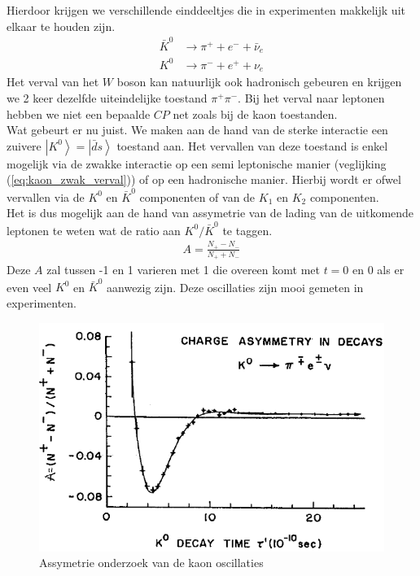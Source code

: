 \documentclass[../main.tex]{subfiles}
\begin{document}
Hierdoor krijgen we verschillende einddeeltjes die in experimenten makkelijk uit elkaar te houden zijn.
\begin{equation}
    \begin{aligned}
        \label{eq:kaon_zwak_verval}
        \bar{K}^{0} &\rightarrow \pi^{+}+e^{-}+\bar{\nu}_{e} \\
        K^{0} &\rightarrow \pi^{-}+e^{+}+\nu_{e}
    \end{aligned}
\end{equation}
Het verval van het $W$ boson kan natuurlijk ook hadronisch gebeuren en krijgen we 2 keer dezelfde uiteindelijke toestand $\pi^+\pi^-$. Bij het verval naar leptonen hebben we niet een bepaalde $CP$ net zoals bij de kaon toestanden.\\
Wat gebeurt er nu juist. We maken aan de hand van de sterke interactie een zuivere $\left|K^0\right>=\left|\bar{d}s\right>$ toestand aan. Het vervallen van deze toestand is enkel mogelijk via de zwakke interactie op een semi leptonische manier (veglijking (\ref{eq:kaon_zwak_verval})) of op een hadronische manier. Hierbij wordt er ofwel vervallen via de $K^0$ en $\bar{K}^0$ componenten of van de $K_1$ en $K_2$ componenten.\\
Het is dus mogelijk aan de hand van assymetrie van de lading van de uitkomende leptonen te weten wat de ratio aan $K^0/\bar{K}^0$ te taggen.
\begin{equation}
    \begin{aligned}
        \label{eq:lepton_lading_assymetrie}
        A=\frac{N_{+}-N_{-}}{N_{+}+N_{-}}
    \end{aligned}
\end{equation}
Deze $A$ zal tussen -1 en 1 varieren met 1 die overeen komt met $t=0$ en 0 als er even veel $K^0$ en $\bar{K}^0$ aanwezig zijn. Deze oscillaties zijn mooi gemeten in experimenten.

\begin{figure}[h]
    \centering
    \includegraphics[width=0.5\linewidth]{meson_mixing_and_oscillations/kaon_osc_verval.png}
    \caption{Assymetrie onderzoek van de kaon oscillaties}%
    \label{fig:meson_mixing_and_oscillations/kaon_osc_verval}
\end{figure}
\end{document}
